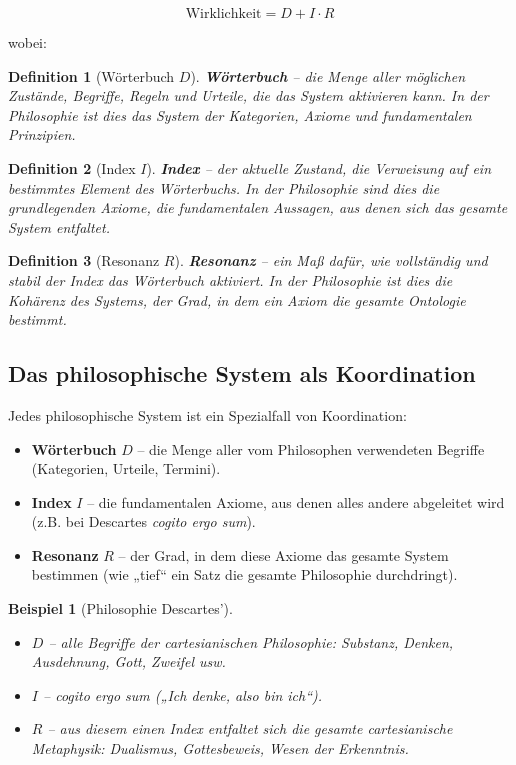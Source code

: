 \documentclass[12pt,a4paper]{article}
\newtheorem{definition}{Definition}[section]
\newtheorem{example}{Beispiel}[section]
\begin{document}
	\begin{equation}
		\boxed{\text{Wirklichkeit} = D + I \cdot R}
	\end{equation}
	
	wobei:
	
	\begin{definition}[Wörterbuch \(D\)]
		\textbf{Wörterbuch} – die Menge aller möglichen Zustände, Begriffe, Regeln und Urteile, die das System aktivieren kann. In der Philosophie ist dies das System der Kategorien, Axiome und fundamentalen Prinzipien.
	\end{definition}
	
	\begin{definition}[Index \(I\)]
		\textbf{Index} – der aktuelle Zustand, die Verweisung auf ein bestimmtes Element des Wörterbuchs. In der Philosophie sind dies die grundlegenden Axiome, die fundamentalen Aussagen, aus denen sich das gesamte System entfaltet.
	\end{definition}
	
	\begin{definition}[Resonanz \(R\)]
		\textbf{Resonanz} – ein Maß dafür, wie vollständig und stabil der Index das Wörterbuch aktiviert. In der Philosophie ist dies die Kohärenz des Systems, der Grad, in dem ein Axiom die gesamte Ontologie bestimmt.
	\end{definition}
	
	\subsection{Das philosophische System als Koordination}
	
	Jedes philosophische System ist ein Spezialfall von Koordination:
	
	\begin{itemize}
		\item \textbf{Wörterbuch} \(D\) – die Menge aller vom Philosophen verwendeten Begriffe (Kategorien, Urteile, Termini).
		\item \textbf{Index} \(I\) – die fundamentalen Axiome, aus denen alles andere abgeleitet wird (z.B. bei Descartes \textit{cogito ergo sum}).
		\item \textbf{Resonanz} \(R\) – der Grad, in dem diese Axiome das gesamte System bestimmen (wie „tief“ ein Satz die gesamte Philosophie durchdringt).
	\end{itemize}
	
	\begin{example}[Philosophie Descartes']
		\begin{itemize}
			\item \(D\) – alle Begriffe der cartesianischen Philosophie: Substanz, Denken, Ausdehnung, Gott, Zweifel usw.
			\item \(I\) – \textit{cogito ergo sum} („Ich denke, also bin ich“).
			\item \(R\) – aus diesem einen Index entfaltet sich die gesamte cartesianische Metaphysik: Dualismus, Gottesbeweis, Wesen der Erkenntnis.
		\end{itemize}
	\end{example}
	
\end{document}
